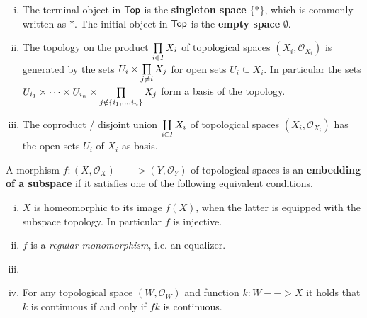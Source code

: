 \begin{example}\vspace{-1.5em}
	\begin{enumerate}[(i)]
		\item{
			The terminal object in $\textsf{Top}$ is the \textbf{singleton space} $\{*\}$, which is commonly written as $*$. The initial object in $\textsf{Top}$ is the \textbf{empty space} $\emptyset$.
		}
		\item{
			The topology on the product $\prod \limits_{i\in I} X_i$ of topological spaces $(X_i, \mathcal{O}_{X_i})$ is generated by the sets $U_i \times \prod \limits_{j \neq i} X_j$ for open sets $U_i \subseteq X_i$. In particular the sets $U_{i_1} \times \dots \times U_{i_n} \times \prod \limits_{j \notin \{i_1, \dots, i_n\}} X_j$ form a basis of the topology. 
		}
		\item{
			The coproduct / disjoint union $\coprod \limits_{i \in I} X_i$ of topological spaces $(X_i,\mathcal{O}_{X_i})$ has the open sets $U_i$ of $X_i$ as basis.
		}
	\end{enumerate}
\end{example}

\begin{definition}
	A morphism $f:(X,\mathcal{O}_X)-->(Y,\mathcal{O}_Y)$ of topological spaces is an \textbf{embedding of a subspace} if it satisfies one of the following equivalent conditions.
	\begin{enumerate}[(i)]
		\item{
			$X$ is homeomorphic to its image $f(X)$, when the latter is equipped with the subspace topology. In particular $f$ is injective.
		}
		\item{
			$f$ is a \textit{regular monomorphism}, i.e. an equalizer.
		}
		\item{
		}
		\item{
			For any topological space $(W,\mathcal{O}_W)$ and function $k:W-->X$ it holds that $k$ is continuous if and only if $fk$ is continuous.
		}
	\end{enumerate}
\end{definition}

